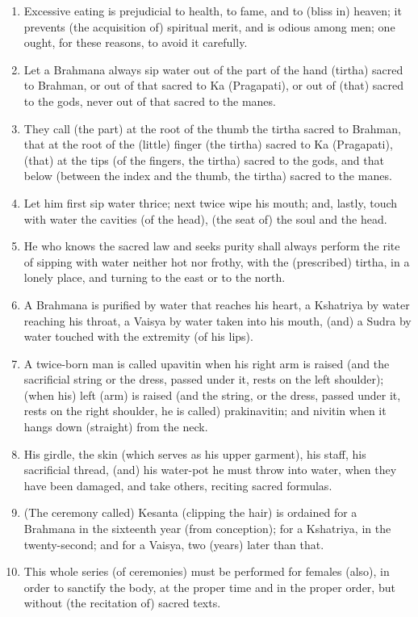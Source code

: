 \begin{enumerate}
\item Excessive eating is prejudicial to health, to fame, and to (bliss in) heaven; it prevents (the acquisition of) spiritual merit, and is odious among men; one ought, for these reasons, to avoid it carefully.
\item Let a Brahmana always sip water out of the part of the hand (tirtha) sacred to Brahman, or out of that sacred to Ka (Pragapati), or out of (that) sacred to the gods, never out of that sacred to the manes.
\item They call (the part) at the root of the thumb the tirtha sacred to Brahman, that at the root of the (little) finger (the tirtha) sacred to Ka (Pragapati), (that) at the tips (of the fingers, the tirtha) sacred to the gods, and that below (between the index and the thumb, the tirtha) sacred to the manes.
\item Let him first sip water thrice; next twice wipe his mouth; and, lastly, touch with water the cavities (of the head), (the seat of) the soul and the head.
\item He who knows the sacred law and seeks purity shall always perform the rite of sipping with water neither hot nor frothy, with the (prescribed) tirtha, in a lonely place, and turning to the east or to the north.
\item A Brahmana is purified by water that reaches his heart, a Kshatriya by water reaching his throat, a Vaisya by water taken into his mouth, (and) a Sudra by water touched with the extremity (of his lips).
\item A twice-born man is called upavitin when his right arm is raised (and the sacrificial string or the dress, passed under it, rests on the left shoulder); (when his) left (arm) is raised (and the string, or the dress, passed under it, rests on the right shoulder, he is called) prakinavitin; and nivitin when it hangs down (straight) from the neck.
\item His girdle, the skin (which serves as his upper garment), his staff, his sacrificial thread, (and) his water-pot he must throw into water, when they have been damaged, and take others, reciting sacred formulas.
\item (The ceremony called) Kesanta (clipping the hair) is ordained for a Brahmana in the sixteenth year (from conception); for a Kshatriya, in the twenty-second; and for a Vaisya, two (years) later than that.
\item This whole series (of ceremonies) must be performed for females (also), in order to sanctify the body, at the proper time and in the proper order, but without (the recitation of) sacred texts.

\end{enumerate}
